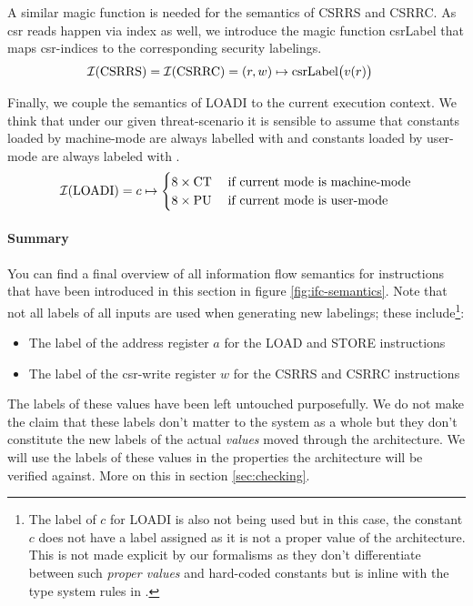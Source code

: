 A similar magic function is needed for the semantics of CSRRS and CSRRC.
As \gls{csr} reads happen via index as well, we introduce the magic function csrLabel that maps \gls{csr}-indices to the corresponding security labelings.
\begin{align*}
    \mathcal{I}(\text{CSRRS}) = \mathcal{I}(\text{CSRRC}) &= (r, w) \mapsto \text{csrLabel}\big(v(r) \big)
\end{align*}

Finally, we couple the semantics of LOADI to the current execution context.
We think that under our given threat-scenario it is sensible to assume that constants loaded by machine-mode are always labelled with \CT{} and constants loaded by user-mode are always labeled with \PU{}.
\begin{equation*}
    \mathcal{I}(\text{LOADI}) = c \mapsto \begin{cases}
        8 \times \text{CT} & \; \text{if current mode is machine-mode} \\
        8 \times \text{PU} & \; \text{if current mode is user-mode}
    \end{cases}
\end{equation*}


\paragraph{Summary}
You can find a final overview of all information flow semantics for instructions that have been introduced in this section in figure \ref{fig:ifc-semantics}.
Note that not all labels of all inputs are used when generating new labelings; these include\footnote{%
    The label of $ c $ for LOADI is also not being used but in this case, the constant $ c $ does not have a label assigned as it is not a proper value of the architecture.
    This is not made explicit by our formalisms as they don't differentiate between such \textit{proper values} and hard-coded constants but is inline with the type system rules in \cite{Ferraiuolo17}.
}:
\begin{itemize}
    \item The label of the address register $ a $ for the LOAD and STORE instructions
    \item The label of the \gls{csr}-write register $ w $ for the CSRRS and CSRRC instructions
\end{itemize}

The labels of these values have been left untouched purposefully.
We do not make the claim that these labels don't matter to the system as a whole but they don't constitute the new labels of the actual \textit{values} moved through the architecture.
We will use the labels of these values in the properties the architecture will be verified against.
More on this in section \ref{sec:checking}.

